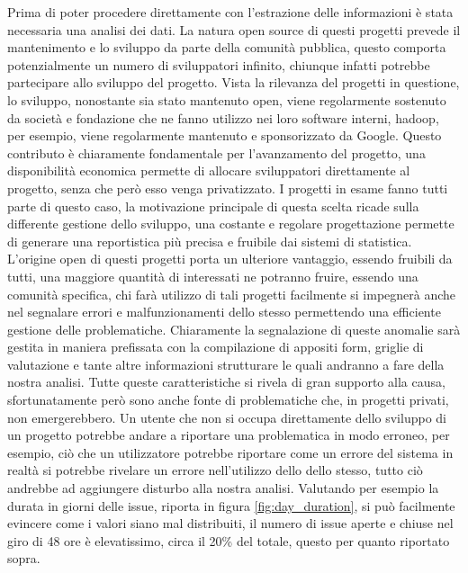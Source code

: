 \documentclass[%
    corpo=12pt,
    twoside,
    oldstyle,
    autoretitolo,
    greek,
    evenboxes,
]{toptesi}
\begin{document}
Prima di poter procedere direttamente con l'estrazione delle informazioni è stata necessaria una analisi dei dati. La natura open source di questi progetti prevede il mantenimento e lo sviluppo da parte della comunità pubblica, questo comporta potenzialmente un numero di sviluppatori infinito, chiunque infatti potrebbe partecipare allo sviluppo del progetto. Vista la rilevanza del progetti in questione, lo sviluppo, nonostante sia stato mantenuto open, viene regolarmente sostenuto da società e fondazione che ne fanno utilizzo nei loro software interni, hadoop, per esempio, viene regolarmente mantenuto e sponsorizzato da Google. Questo contributo è chiaramente fondamentale per l'avanzamento del progetto, una disponibilità economica permette di allocare sviluppatori direttamente al progetto, senza che però esso venga privatizzato. I progetti in esame fanno tutti parte di questo caso, la motivazione principale di questa scelta ricade sulla differente gestione dello sviluppo, una costante e regolare progettazione permette di generare una reportistica più precisa e fruibile dai sistemi di statistica. L'origine open di questi progetti porta un ulteriore vantaggio, essendo fruibili da tutti, una maggiore quantità di interessati ne potranno fruire, essendo una comunità specifica, chi farà utilizzo di tali progetti facilmente si impegnerà anche nel segnalare errori e malfunzionamenti dello stesso permettendo una efficiente gestione delle problematiche. Chiaramente la segnalazione di queste anomalie sarà gestita in maniera prefissata con la compilazione di appositi form, griglie di valutazione e tante altre informazioni strutturare le quali andranno a fare della nostra analisi. Tutte queste caratteristiche si rivela di gran supporto alla causa, sfortunatamente però sono anche fonte di problematiche che, in progetti privati, non emergerebbero. Un utente che non si occupa direttamente dello sviluppo di un progetto potrebbe andare a riportare una problematica in modo erroneo, per esempio, ciò che un utilizzatore potrebbe riportare come un errore del sistema in realtà si potrebbe rivelare un errore nell'utilizzo dello dello stesso, tutto ciò andrebbe ad aggiungere disturbo alla nostra analisi. Valutando per esempio la durata in giorni delle issue, riporta in figura \ref{fig:day_duration}, si può facilmente evincere come i valori siano mal distribuiti, il numero di issue aperte e chiuse nel giro di 48 ore è elevatissimo, circa il 20\% del totale, questo per quanto riportato sopra.
\end{document}
